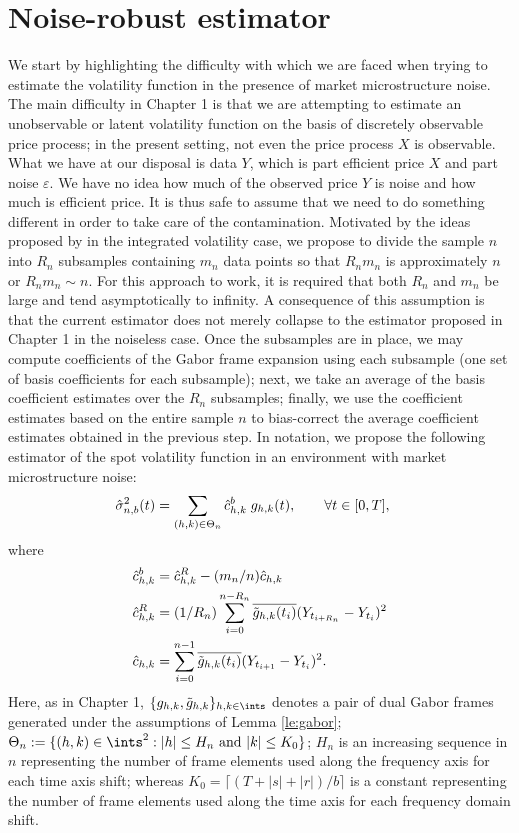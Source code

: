 \section{Noise-robust estimator} \label{sec:estimator2}
We start by highlighting the difficulty with which we are faced when trying to estimate the volatility function in the presence of market microstructure noise. The main difficulty in Chapter 1 is that we are attempting to estimate an unobservable or latent volatility function on the basis of discretely observable price process; in the present setting, not even the price process $X$ is observable. What we have at our disposal is data $Y$, which is part efficient price $X$ and part noise $\varepsilon$. We have no idea how much of the observed price $Y$ is noise and how much is efficient price. It is thus safe to assume that we need to do something different in order to take care of the contamination. Motivated by the ideas proposed by \cite{Zhang2005} in the integrated volatility case, we propose to divide the sample $n$ into $R_n$ subsamples containing $m_n$ data points so that $R_n m_n$ is approximately $n$ or $R_n m_n \sim n$. For this approach to work, it is required that both $R_n$ and $m_n$ be large and tend asymptotically to infinity. A consequence of this assumption is that the current estimator does not merely collapse to the estimator proposed in Chapter 1 in the noiseless case. Once the subsamples are in place, we may compute coefficients of the Gabor frame expansion using each subsample (one set of basis coefficients for each subsample); next, we  take an average of the basis coefficient estimates over the $R_n$ subsamples; finally, we use  the coefficient estimates based on  the entire sample $n$ to bias-correct the average  coefficient estimates obtained in the previous step. In notation, we propose the following estimator of the spot volatility function in an environment with market microstructure noise:
\begin{align}
  &\hat{\sigma}_{n,b}^2(t) = \sum_{(h,k) \in \Theta_n} \hat{c}_{h,k}^b\;g_{h,k}(t),\qquad \forall t \in [0,T], \label{eq:noiseest}
\end{align}
where
\begin{align}
  &\hat{c}_{h,k}^b = \hat{c}_{h,k}^R - (m_n/n)\hat{c}_{h,k} \\
  &\hat{c}_{h,k}^R = (1/R_n)\sum_{i =0}^{n -R_n} \overline{\tilde{g}_{h,k}(t_i)} (Y_{t_{i+R_n}} - Y_{t_i})^2 \label{eq:subset} \\
  &\hat{c}_{h,k} = \sum_{i =0}^{n-1} \overline{\tilde{g}_{h,k}(t_i)} (Y_{t_{i+1}} - Y_{t_i})^2.
  \label{}
\end{align}
Here, as in Chapter 1, $\{g_{h,k}, \tghk\}_{h,k \in \ints}$ denotes a pair of dual Gabor frames generated under the assumptions of Lemma \eqref{le:gabor}; $\Theta_n := \{(h,k) \in \ints^2 : |h| \le H_n \text{ and }|k| \le K_0\}$;  $H_n$ is an increasing sequence in $n$ representing the number of frame elements used along the frequency axis for each time axis shift; whereas  $K_0= \lceil (T + |s| + |r|)/b \rceil$  is a constant representing the number of frame elements used along the time axis for each frequency domain shift. 

